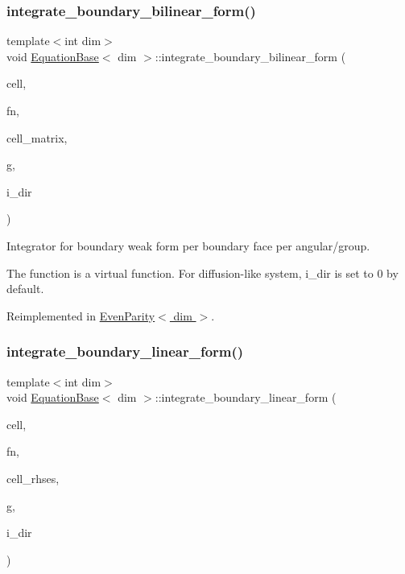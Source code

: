 \subsubsection{\texorpdfstring{integrate\+\_\+boundary\+\_\+bilinear\+\_\+form()}{integrate\_boundary\_bilinear\_form()}}
{\footnotesize\ttfamily template$<$int dim$>$ \\
void \hyperlink{class_equation_base}{Equation\+Base}$<$ dim $>$\+::integrate\+\_\+boundary\+\_\+bilinear\+\_\+form (\begin{DoxyParamCaption}\item[{typename Do\+F\+Handler$<$ dim $>$\+::active\+\_\+cell\+\_\+iterator \&}]{cell,  }\item[{unsigned int \&}]{fn,  }\item[{Full\+Matrix$<$ double $>$ \&}]{cell\+\_\+matrix,  }\item[{const unsigned int \&}]{g,  }\item[{const unsigned int \&}]{i\+\_\+dir }\end{DoxyParamCaption})\hspace{0.3cm}{\ttfamily [virtual]}}



Integrator for boundary weak form per boundary face per angular/group. 

The function is a virtual function. For diffusion-\/like system, i\+\_\+dir is set to 0 by default. 

Reimplemented in \hyperlink{class_even_parity_ae800cb49f85cf417167ca5385b50df6f}{Even\+Parity$<$ dim $>$}.

\mbox{\label{class_equation_base_a1a213c4e21984bead9146e50be97077f}} 
\subsubsection{\texorpdfstring{integrate\+\_\+boundary\+\_\+linear\+\_\+form()}{integrate\_boundary\_linear\_form()}}
{\footnotesize\ttfamily template$<$int dim$>$ \\
void \hyperlink{class_equation_base}{Equation\+Base}$<$ dim $>$\+::integrate\+\_\+boundary\+\_\+linear\+\_\+form (\begin{DoxyParamCaption}\item[{typename Do\+F\+Handler$<$ dim $>$\+::active\+\_\+cell\+\_\+iterator \&}]{cell,  }\item[{unsigned int \&}]{fn,  }\item[{Vector$<$ double $>$ \&}]{cell\+\_\+rhses,  }\item[{const unsigned int \&}]{g,  }\item[{const unsigned int \&}]{i\+\_\+dir }\end{DoxyParamCaption})\hspace{0.3cm}{\ttfamily [virtual]}}



